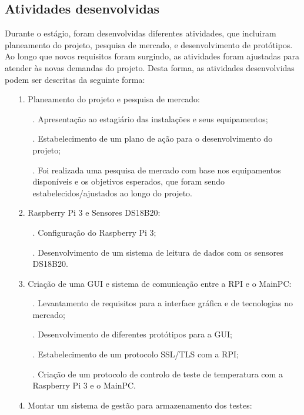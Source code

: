 \subsection{Atividades desenvolvidas}

Durante o estágio, foram desenvolvidas diferentes atividades, que incluiram  planeamento do projeto, pesquisa de mercado, e desenvolvimento de protótipos.
Ao longo que novos requisitos foram surgindo, as atividades foram ajustadas para atender às novas demandas do projeto. Desta forma, as atividades desenvolvidas
podem ser descritas da seguinte forma:
\begin{itemize}
    \item[] 1. Planeamento do projeto e pesquisa de mercado:
        \begin{itemize}
            \item[.] Apresentação ao estagiário das instalações e seus equipamentos;
            \item[.] Estabelecimento de um plano de ação para o desenvolvimento do projeto;
            \item[.] Foi realizada uma pesquisa de mercado com base nos equipamentos disponíveis e os objetivos esperados, que foram sendo estabelecidos/ajustados 
            ao longo do projeto.
        \end{itemize}
    \item[] 2. Raspberry Pi 3 e Sensores DS18B20:
        \begin{itemize}
            \item[.] Configuração do Raspberry Pi 3;
            \item[.] Desenvolvimento de um sistema de leitura de dados com os sensores DS18B20.
        \end{itemize}
    \item[] 3. Criação de uma GUI e sistema de comunicação entre a RPI e o MainPC: 
        \begin{itemize}
            \item[.] Levantamento de requisitos para a interface gráfica e de tecnologias no mercado;
            \item[.] Desenvolvimento de diferentes protótipos para a GUI;
            \item[.] Estabelecimento de um protocolo SSL/TLS com a RPI;
            \item[.] Criação de um protocolo de controlo de teste de temperatura com a Raspberry Pi 3 e o MainPC.
        \end{itemize}
    \item[] 4. Montar um sistema de gestão para armazenamento dos testes:

\end{itemize}
